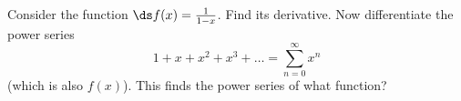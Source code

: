 Consider the function $\ds f(x)=\frac{1}{1-x}$.  Find its derivative.  Now differentiate the power series
  $$1 + x + x^2 + x^3 + \dots = \sum_{n=0}^\infty x^n$$
(which is also $f(x)$).  This finds the power series of what function?